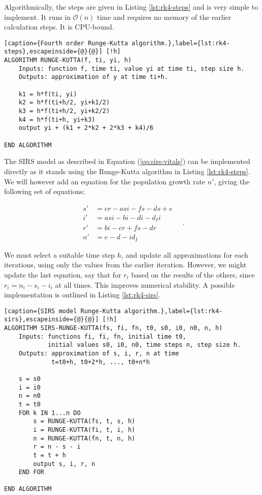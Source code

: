 \documentclass[]{article}
\begin{document}
Algorithmically, the steps are given in Listing \ref{lst:rk4-steps} and is very simple to implement. It runs in $\mathcal{O}(n)$ time and requires no memory of the earlier calculation steps. It is CPU-bound.

\begin{lstlisting}[caption={Fourth order Runge-Kutta algorithm.},label={lst:rk4-steps},escapeinside={@}{@}] [!h]
ALGORITHM RUNGE-KUTTA(f, ti, yi, h)
	Inputs: function f, time ti, value yi at time ti, step size h.
	Outputs: approximation of y at time ti+h.
	
	k1 = h*f(ti, yi)
	k2 = h*f(ti+h/2, yi+k1/2)
	k3 = h*f(ti+h/2, yi+k2/2)
	k4 = h*f(ti+h, yi+k3)
	output yi + (k1 + 2*k2 + 2*k3 + k4)/6

END ALGORITHM
\end{lstlisting}

The SIRS model as described in Equation (\ref{eq:sirs-vitals}) can be implemented directly as it stands using the Runge-Kutta algorithm in Listing \ref{lst:rk4-steps}. We will however add an equation for the population growth rate $n'$, giving the following set of equations;

\begin{equation} \label{eq:sirs-rk4}
\begin{aligned}
	s' &= cr - asi - fs - ds + e \\
	i' &= asi - bi - di -d_Ii \\
	r' &= bi - cr + fs - dr \\
	n' &= e - d - id_I
\end{aligned} \quad .
\end{equation}

We must select a suitable time step $h$, and update all approximations for each iterations, using only the values from the earlier iteration. However, we might update the last equation, say that for $r_i$ based on the results of the others, since $r_i = n_i - s_i - i_i$ at all times. This improves numerical stability. A possible implementation is outlined in Listing \ref{lst:rk4-sirs}.

\begin{lstlisting}[caption={SIRS model Runge-Kutta algorithm.},label={lst:rk4-sirs},escapeinside={@}{@}] [!h]
ALGORITHM SIRS-RUNGE-KUTTA(fs, fi, fn, t0, s0, i0, n0, n, h)
	Inputs: functions fi, fi, fn, initial time t0, 
			initial values s0, i0, n0, time steps n, step size h.
	Outputs: approximation of s, i, r, n at time
			 t=t0+h, t0+2*h, ..., t0+n*h
	
	s = s0
	i = i0
	n = n0
	t = t0
	FOR k IN 1...n DO
		s = RUNGE-KUTTA(fs, t, s, h)
		i = RUNGE-KUTTA(fi, t, i, h)
		n = RUNGE-KUTTA(fn, t, n, h)
		r = n - s - i
		t = t + h
		output s, i, r, n
	END FOR

END ALGORITHM
\end{lstlisting}
\end{document}
